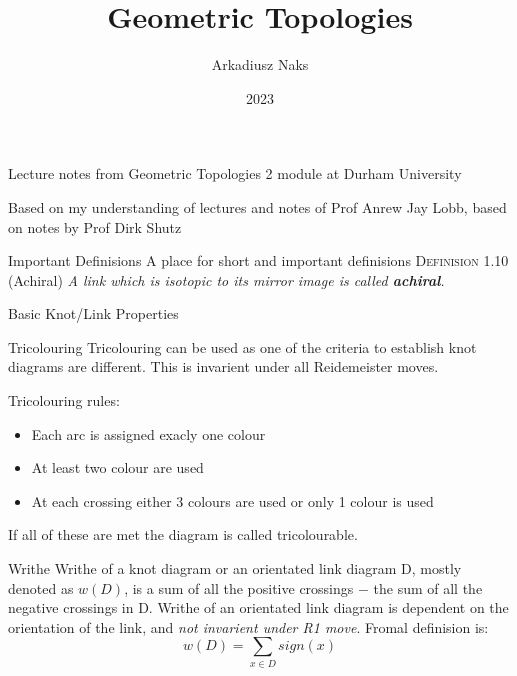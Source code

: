 \documentclass[12pt, letterpaper]{article}
\title{Geometric Topologies}
\author{Arkadiusz Naks}
\date{2023}
\begin{document}
\begin{titlepage}
  \begin{center}
    \makeatletter
    \vspace*{1cm}
    \Huge
    \textbf{\@title}

    \vspace{0.5cm}
    \Large
    Lecture notes from Geometric Topologies 2 module at Durham University

    \vspace{1.5cm}

    \textbf{\@author}

    \vfill

    \vspace{0.8cm}

    \small
    Based on my understanding of lectures and notes of Prof Anrew Jay Lobb,
    based on notes by Prof Dirk Shutz\\
    
    \@date{}
  \end{center}
\end{titlepage}

\tableofcontents
\newpage

\begin{section}{Important Definisions}
  A place for short and important definisions
  \textsc{Definision 1.10} (Achiral) \textit{A link which is isotopic to its mirror image is called \textbf{achiral}.}
\end{section}

\begin{section}{Basic Knot/Link Properties}

  \begin{subsection}{Tricolouring}
    Tricolouring can be used as one of the criteria to establish knot diagrams are different.
    This is invarient under all Reidemeister moves.

    Tricolouring rules:
    \begin{itemize}
      \item Each arc is assigned exacly one colour
      \item At least two colour are used
      \item At each crossing either 3 colours are used or only 1 colour is used
    \end{itemize}
    If all of these are met the diagram is called tricolourable.
  \end{subsection}

  \begin{subsection}{Writhe}
    Writhe of a knot diagram or an orientated link diagram D, mostly denoted as \(w(D)\),
    is a sum of all the positive crossings \(-\) the sum of all the negative crossings in D.
    Writhe of an orientated link diagram is dependent on the orientation of the link,
    and \emph{not invarient under R1 move}.
    Fromal definision is: \[w(D) = \sum_{x \in D} sign(x)\]
  \end{subsection}

\end{section}
\end{document}

